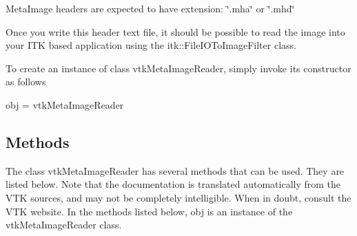 Meta\-Image headers are expected to have extension\-: \char`\"{}.\-mha\char`\"{} or \char`\"{}.\-mhd\char`\"{}

Once you write this header text file, it should be possible to read the image into your I\-T\-K based application using the itk\-::\-File\-I\-O\-To\-Image\-Filter class.

To create an instance of class vtk\-Meta\-Image\-Reader, simply invoke its constructor as follows \begin{DoxyVerb}  obj = vtkMetaImageReader
\end{DoxyVerb}
 \hypertarget{vtkwidgets_vtkxyplotwidget_Methods}{}\subsection{Methods}\label{vtkwidgets_vtkxyplotwidget_Methods}
The class vtk\-Meta\-Image\-Reader has several methods that can be used. They are listed below. Note that the documentation is translated automatically from the V\-T\-K sources, and may not be completely intelligible. When in doubt, consult the V\-T\-K website. In the methods listed below, {\ttfamily obj} is an instance of the vtk\-Meta\-Image\-Reader class. 
